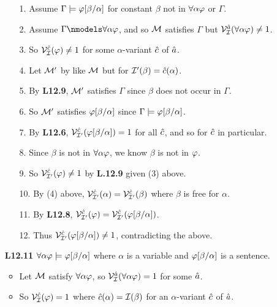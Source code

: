 \documentclass[a4paper, 11pt]{article} %
\begin{document}
\begin{enumerate}[labelsep=.1in]
    \begin{itemize}
      \item[1.] Assume $\Gamma \models \varphi[\beta/\alpha]$ for constant $\beta$ not in $\forall \alpha\varphi$ or $\Gamma$.
      \item[2.] Assume $\Gamma \nmodels \qt{\forall}{\alpha}\metaA$, and so $\mathcal{M}$ satisfies $\Gamma$ but $\mathcal{V}_{\mathcal{I}}^{\hat{a}}(\forall \alpha\varphi)\neq 1$.
      \item[3.] So $\mathcal{V}_{\mathcal{I}}^{\hat{c}}(\varphi)\neq 1$ for some $\alpha$-variant $\hat{c}$ of $\hat{a}$.
      \item[4.] Let $\mathcal{M}'$ by like $\mathcal{M}$ but for $\mathcal{I}'(\beta)=\hat{c}(\alpha)$.
      \item[5.] By \textbf{L12.9}, $\mathcal{M}'$ satisfies $\Gamma$ since $\beta$ does not occur in $\Gamma$.
      \item[6.] So $\mathcal{M}'$ satisfies $\varphi[\beta/\alpha]$ since $\Gamma \models \varphi[\beta/\alpha]$.
      \item[7.] By \textbf{L12.6}, $\mathcal{V}_{\mathcal{I}'}^{\hat{c}}(\varphi[\beta/\alpha])=1$ for all $\hat{c}$, and so for $\hat{c}$ in particular.
      \item[8.] Since $\beta$ is not in $\forall \alpha\varphi$, we know $\beta$ is not in $\varphi$.
      \item[9.] So $\mathcal{V}_{\mathcal{I}'}^{\hat{c}}(\varphi)\neq 1$ by \textbf{L.12.9} given (3) above. 
      \item[10.] By (4) above, $\mathcal{V}_{\mathcal{I}'}^{\hat{c}}(\alpha)=\mathcal{V}_{\mathcal{I}'}^{\hat{c}}(\beta)$ where $\beta$ is free for $\alpha$. 
      \item[11.] By \textbf{L12.8}, $\mathcal{V}_{\mathcal{I}'}^{\hat{c}}(\varphi)=\mathcal{V}_{\mathcal{I}'}^{\hat{c}}(\varphi[\beta/\alpha])$.
      \item[12.] Thus $\mathcal{V}_{\mathcal{I}'}^{\hat{c}}(\varphi[\beta/\alpha])\neq 1$, contradicting the above.
    \end{itemize}
  \item[\bf L12.11] $\forall\alpha\varphi \models \varphi[\beta/\alpha]$ where $\alpha$ is a variable and $\varphi[\beta/\alpha]$ is a sentence.
    \begin{itemize}
      \item Let $\mathcal{M}$ satisfy $\forall \alpha\varphi$, so $\mathcal{V}_{\mathcal{I}}^{\hat{a}}(\forall \alpha\varphi)=1$ for some $\hat{a}$. 
      \item So $\mathcal{V}_{\mathcal{I}}^{\hat{c}}(\varphi)=1$ where $\hat{c}(\alpha)=\mathcal{I}(\beta)$ for an $\alpha$-variant $\hat{c}$ of $\hat{a}$.

\end{itemize}
\end{enumerate}
\end{document}
